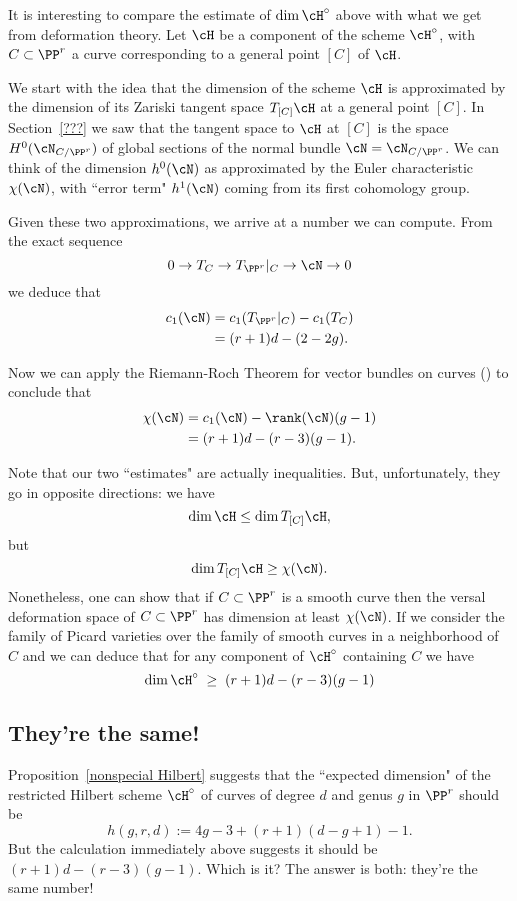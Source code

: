 It is interesting to compare the estimate of  $\dim \cH^\circ$ above with what we get from deformation theory. Let $\cH$ be a component of the scheme $\cH^\circ$, with $C \subset \PP^r$ a curve corresponding to a general point $[C]$ of $\cH$.

We start with the idea that the dimension of the scheme $\cH$ is approximated by the dimension of its Zariski tangent space $T_{[C]}\cH$ at a general point $[C]$. In Section~\ref{???} we saw that the tangent space to $\cH$ at $[C]$ is the space $H^0(\cN_{C/\PP^r})$ of global sections of the normal bundle $\cN = \cN_{C/\PP^r}$. We can think of the dimension $h^0(\cN)$ as approximated by the Euler characteristic $\chi(\cN)$, with ``error term" $h^1(\cN)$ coming from its first cohomology group.

Given these two approximations, we arrive at a number we can  compute. From the exact sequence
$$
0 \to T_C \to T_{\PP^r}|_C \to \cN \to 0
$$
we deduce that
\begin{align*}
c_1(\cN) &= c_1(T_{\PP^r}|_C) - c_1(T_C) \\
&= (r+1)d - (2-2g).
\end{align*}

Now we can apply the Riemann-Roch Theorem for vector bundles on curves (\cite[Theorem ???]{3264}) to conclude that
\begin{align*}
\chi(\cN) &= c_1(\cN) - \rank(\cN)(g-1) \\
&= (r+1)d - (r-3)(g-1).
\end{align*}

Note that our two ``estimates" are actually inequalities. But, unfortunately, they go in opposite directions: we have
$$
\dim \cH \leq \dim T_{[C]}\cH,
$$
but 
$$
\dim T_{[C]}\cH \geq \chi(\cN).
$$
Nonetheless, one can show that if $C \subset \PP^r$ is a smooth curve then the versal deformation space of $C \subset \PP^r$ has dimension at least $\chi(\cN)$. If we consider the family of Picard varieties over the family of smooth curves in a neighborhood of $C$ and we can deduce that for any component of $\cH^\circ$ containing $C$ we have
$$
\dim \cH^\circ \; \geq \; (r+1)d - (r-3)(g-1)
$$

\subsection{They're the same!} Proposition~\ref{nonspecial Hilbert} suggests that the ``expected dimension" of the restricted Hilbert scheme $\cH^\circ$ of curves of degree $d$ and genus $g$ in $\PP^r$ should be 
$$
h(g,r,d) := 4g-3 + (r+1)(d-g+1) - 1.
$$
But the calculation immediately above suggests it should be $(r+1)d - (r-3)(g-1)$. Which is it? The answer is both: they're the same number!

